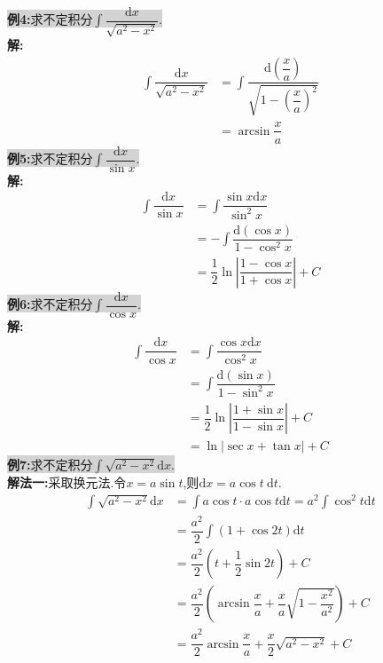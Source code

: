 \documentclass[a4paper,oneside]{ctexart}
\newcommand{\di}{\mathrm{d}}
\begin{document}
\colorbox{lightgray}{\textbf{例4:}求不定积分$\int{\dfrac{\di x}{\sqrt{a^2-x^2}}}$.}\\
\textbf{解:}
$$\begin{aligned}
  \int{\dfrac{\di x}{\sqrt{a^2-x^2}}} &= \int{\dfrac{\di\left(\dfrac{x}{a}\right)}{\sqrt{1-\left(\dfrac{x}{a}\right)^2}}}\\
                                      &= \arcsin{\dfrac{x}{a}}
\end{aligned}$$
\colorbox{lightgray}{\textbf{例5:}求不定积分$\int{\dfrac{\di x}{\sin{x}}}$.}\\
\textbf{解:}
$$\begin{aligned}
  \int{\dfrac{\di x}{\sin x}} &= \int{\dfrac{\sin{x}\di x}{\sin^2{x}}}\\
                              &= -\int{\dfrac{\di(\cos{x})}{1-\cos^2{x}}}\\
                              &= \dfrac{1}{2}\ln\left\lvert\dfrac{1-\cos{x}}{1+\cos{x}}\right\rvert+C
\end{aligned}$$
\colorbox{lightgray}{\textbf{例6:}求不定积分$\int{\dfrac{\di x}{\cos{x}}}$.}\\
\textbf{解:}
$$\begin{aligned}
  \int{\dfrac{\di x}{\cos x}} &= \int{\dfrac{\cos{x}\di x}{\cos^2{x}}}\\
                              &= \int{\dfrac{\di(\sin{x})}{1-\sin^2{x}}}\\
                              &= \dfrac{1}{2}\ln\left\lvert\dfrac{1+\sin{x}}{1-\sin{x}}\right\rvert+C\\
                              &= \ln\left\lvert\sec{x}+\tan{x}\right\rvert+C
\end{aligned}$$
\colorbox{lightgray}{\textbf{例7:}求不定积分$\int{\sqrt{a^2-x^2}\di x}$.}\\
\textbf{解法一:}采取换元法.令$x=a\sin{t}$,则$\di x=a\cos{t}\ \di t$.
$$\begin{aligned}
  \int{\sqrt{a^2-x^2}\di x} &= \int{a\cos{t}\cdot a\cos{t}\di t} = a^2\int{\cos^2{t}\di t} \\
                            &= \dfrac{a^2}{2}\int{(1+\cos{2t})\di t} \\
                            &= \dfrac{a^2}{2}\left(t+\dfrac{1}{2}\sin{2t}\right)+C \\
                            &= \dfrac{a^2}{2}\left(\arcsin{\dfrac{x}{a}}+\dfrac{x}{a}\sqrt{1-\dfrac{x^2}{a^2}}\right)+C \\
                            &= \dfrac{a^2}{2}\arcsin{\dfrac{x}{a}}+\dfrac{x}{2}\sqrt{a^2-x^2}+C
\end{aligned}$$
\end{document}
